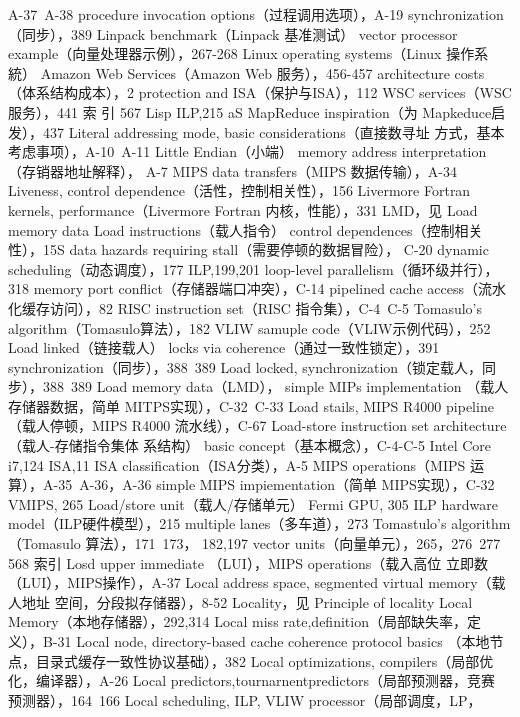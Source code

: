 A-37~A-38
procedure invocation options（过程调用选项），A-19
synchronization（同步），389
Linpack benchmark（Linpack 基准测试）
vector processor example（向量处理器示例），267-268
Linux operating systems（Linux 操作系統）
Amazon Web Services（Amazon Web 服务），456-457
architecture costs（体系结构成本），2
protection and ISA（保护与ISA），112
WSC services（WSC服务），441
索
引
567
Lisp
ILP,215
aS MapReduce inspiration（为 Mapkeduce启发），437
Literal addressing mode, basic considerations（直接数寻址
方式，基本考虑事项），A-10~A-11
Little Endian（小端）
memory address interpretation（存销器地址解释），
A-7
MIPS data transfers（MIPS 数据传输），A-34
Liveness, control dependence（活性，控制相关性），156
Livermore Fortran kernels, performance（Livermore Fortran
内核，性能），331
LMD，见 Load memory data
Load instructions（载人指令）
control dependences（控制相关性），15S
data hazards requiring stall（需要停顿的数据冒险），
C-20
dynamic scheduling（动态调度），177
ILP,199,201
loop-level parallelism（循环级并行），318
memory port conflict（存储器端口冲突），C-14
pipelined cache access（流水化缓存访问），82
RISC instruction set（RISC 指令集），C-4~C-5
Tomasulo's algorithm（Tomasulo算法），182
VLIW samuple code（VLIW示例代码），252
Load linked（链接载人）
locks via coherence（通过一致性锁定），391
synchronization（同步），388~389
Load locked, synchronization（锁定载人，同步），388~389
Load memory data（LMD）， simple MIPs implementation
（载人存储器数据，简单 MITPS实现），C-32~C-33
Load stails, MIPS R4000 pipeline（载人停顿，MIPS R4000
流水线），C-67
Load-store instruction set architecture（载人-存储指令集体
系结构）
basic concept（基本概念），C-4-C-5
Intel Core i7,124
ISA,11
ISA classification（ISA分类），A-5
MIPS operations（MIPS 运算），A-35~A-36，A-36
simple MIPS impiementation（简单 MIPS实现），C-32
VMIPS, 265
Load/store unit（载人/存储单元）
Fermi GPU, 305
ILP hardware model（ILP硬件模型），215
multiple lanes（多车道），273
Tomastulo's algorithm（Tomasulo 算法），171~173，
182,197
vector units（向量单元），265，276~277
568
索引
Losd upper immediate （LUI），MIPS operations（载入高位
立即数（LUI），MIPS操作），A-37
Local address space, segmented virtual memory（载人地址
空间，分段拟存储器），8-52
Locality，见 Principle of locality
Local Memory（本地存储器），292,314
Local miss rate,definition（局部缺失率，定义），B-31
Local node, directory-based cache coherence protocol basics
（本地节点，目录式缓存一致性协议基础），382
Local optimizations, compilers（局部优化，编译器），A-26
Local predictors,tournarnentpredictors（局部预测器，竞赛
预测器），164~166
Local scheduling, ILP, VLIW processor（局部调度，LP，
